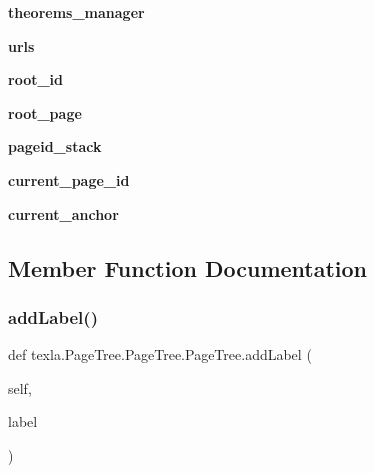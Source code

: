 \begin{DoxyCompactItemize}
\hypertarget{classtexla_1_1PageTree_1_1PageTree_1_1PageTree_a3e46677f7762801936e2d8264b000731}{}\label{classtexla_1_1PageTree_1_1PageTree_1_1PageTree_a3e46677f7762801936e2d8264b000731} 
{\bfseries theorems\+\_\+manager}
\item 
\hypertarget{classtexla_1_1PageTree_1_1PageTree_1_1PageTree_ae7ea95558c84c755de1a16fb78854e9f}{}\label{classtexla_1_1PageTree_1_1PageTree_1_1PageTree_ae7ea95558c84c755de1a16fb78854e9f} 
{\bfseries urls}
\item 
\hypertarget{classtexla_1_1PageTree_1_1PageTree_1_1PageTree_a4b1b8c22911434ec40c17bcc2a82205a}{}\label{classtexla_1_1PageTree_1_1PageTree_1_1PageTree_a4b1b8c22911434ec40c17bcc2a82205a} 
{\bfseries root\+\_\+id}
\item 
\hypertarget{classtexla_1_1PageTree_1_1PageTree_1_1PageTree_a866545bb647ff934a3c97462fd913697}{}\label{classtexla_1_1PageTree_1_1PageTree_1_1PageTree_a866545bb647ff934a3c97462fd913697} 
{\bfseries root\+\_\+page}
\item 
\hypertarget{classtexla_1_1PageTree_1_1PageTree_1_1PageTree_a250278ad735438991726f311efaf7179}{}\label{classtexla_1_1PageTree_1_1PageTree_1_1PageTree_a250278ad735438991726f311efaf7179} 
{\bfseries pageid\+\_\+stack}
\item 
\hypertarget{classtexla_1_1PageTree_1_1PageTree_1_1PageTree_aaf5433f0e4cb421cf5f253d20622c4e7}{}\label{classtexla_1_1PageTree_1_1PageTree_1_1PageTree_aaf5433f0e4cb421cf5f253d20622c4e7} 
{\bfseries current\+\_\+page\+\_\+id}
\item 
\hypertarget{classtexla_1_1PageTree_1_1PageTree_1_1PageTree_a0c86ccf93fdb80041f58c11baad6ca8d}{}\label{classtexla_1_1PageTree_1_1PageTree_1_1PageTree_a0c86ccf93fdb80041f58c11baad6ca8d} 
{\bfseries current\+\_\+anchor}
\end{DoxyCompactItemize}


\subsection{Member Function Documentation}
\hypertarget{classtexla_1_1PageTree_1_1PageTree_1_1PageTree_a7b0b920255477e1c0cf155147ded847a}{}\label{classtexla_1_1PageTree_1_1PageTree_1_1PageTree_a7b0b920255477e1c0cf155147ded847a} 
\subsubsection{\texorpdfstring{add\+Label()}{addLabel()}}
{\footnotesize\ttfamily def texla.\+Page\+Tree.\+Page\+Tree.\+Page\+Tree.\+add\+Label (\begin{DoxyParamCaption}\item[{}]{self,  }\item[{}]{label }\end{DoxyParamCaption})}

